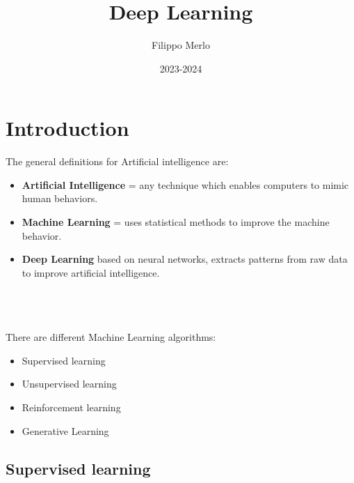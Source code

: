 \documentclass[oneside]{academica}
\title{Deep Learning}
\author{Filippo Merlo}
\date{2023-2024}
\begin{document}
\frontmatter

\maketitle

\tableofcontents

\mainmatter

\chapter{Introduction}

\begin{minipage}{0.6\linewidth}
The general definitions for Artificial intelligence are:
  \begin{itemize}
    \item \textbf{Artificial Intelligence} = any technique which enables computers to mimic human behaviors.
    \item \textbf{Machine Learning} = uses statistical methods to improve the machine behavior.
    \item \textbf{Deep Learning} based on neural networks, extracts patterns from raw data to improve artificial intelligence.
  \end{itemize}
\end{minipage}
\hspace{0.02\linewidth}
\begin{minipage}{0.3\linewidth}
\end{minipage}
\\\\\\
There are different Machine Learning algorithms:
\begin{itemize}
  \item Supervised learning
  \item Unsupervised learning
  \item Reinforcement learning
  \item Generative Learning
\end{itemize}

\section{Supervised learning}
\end{document}
